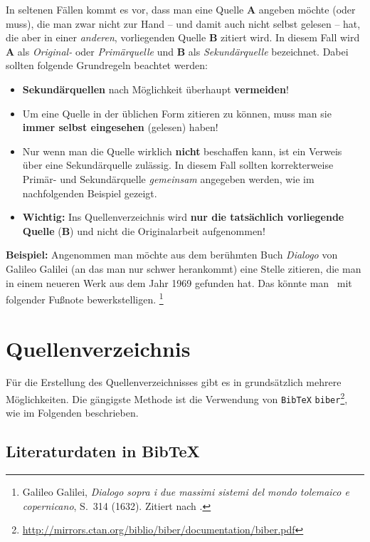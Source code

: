 In seltenen Fällen kommt es vor, dass man eine Quelle \textbf{A} angeben
möchte (oder muss), die man zwar nicht zur Hand -- und damit auch nicht selbst gelesen --
hat, die aber in einer \emph{anderen}, vorliegenden Quelle \textbf{B} zitiert wird.
In diesem Fall wird \textbf{A} als \emph{Original-} oder \emph{Primärquelle} und \textbf{B} 
als \emph{Sekundärquelle} bezeichnet. Dabei sollten folgende Grundregeln beachtet werden:
%
\begin{itemize}
\item
\textbf{Sekundärquellen} nach Möglichkeit überhaupt \textbf{vermeiden}!
\item
Um eine Quelle in der üblichen Form zitieren zu können, muss man sie \textbf{immer selbst
eingesehen} (gelesen) haben!
\item
Nur wenn man die Quelle wirklich \textbf{nicht} beschaffen kann, ist ein Verweis über eine Sekundärquelle
zulässig. In diesem Fall sollten korrekterweise Pri\-mär- und Sekundärquelle \emph{gemeinsam} 
angegeben werden, wie im nachfolgenden Beispiel gezeigt.
\item
\textbf{Wichtig:} Ins Quellenverzeichnis wird \textbf{nur die tatsächlich vorliegende Quelle} 
(\textbf{B}) und nicht die Originalarbeit aufgenommen!
\end{itemize}
%
\textbf{Beispiel:} Angenommen man möchte aus dem berühmten Buch \emph{Dialogo} von Galileo Galilei 
(an das man nur schwer herankommt) eine Stelle zitieren, die man in einem neueren Werk aus dem Jahr 1969 
gefunden hat. Das könnte man \zB\ mit folgender Fußnote bewerkstelligen.%
\footnote{Galileo Galilei, \emph{Dialogo sopra i due massimi sistemi del mondo tolemaico e copernicano}, 
S.~314 (1632). Zitiert nach \cite[S.~59]{Hemleben1969}.} %


\section{Quellenverzeichnis}


Für die Erstellung des Quellenverzeichnisses gibt es in \latex grundsätzlich 
mehrere Möglichkeiten.
Die gängigste Methode ist die Verwendung von \texttt{BibTeX} \cite{Patashnik1988} \bzw 
\texttt{biber}\footnote{\url{http://mirrors.ctan.org/biblio/biber/documentation/biber.pdf}}, 
wie im Folgenden beschrieben.


\subsection{Literaturdaten in BibTeX}
\label{sec:bibtex}

